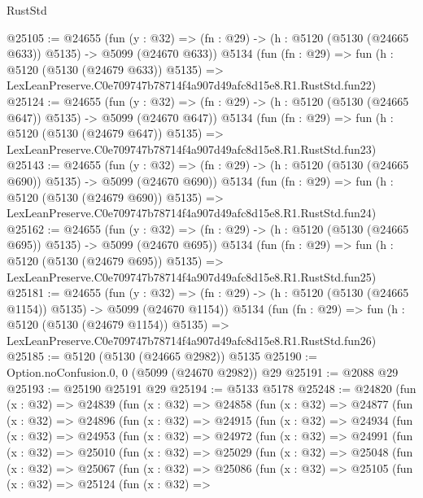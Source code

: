 \begin{lexlean}{RustStd}
\begin{coremodule}
@25105 := @24655
    (fun (y : @32) => (fn : @29) -> (h : @5120 (@5130 (@24665 @633)) @5135) -> @5099 (@24670 @633))
    @5134
    (fun (fn : @29) =>
    fun (h : @5120 (@5130 (@24679 @633)) @5135) =>
    LexLeanPreserve.C0e709747b78714f4a907d49afc8d15e8.R1.RustStd.fun22)
@25124 := @24655
    (fun (y : @32) => (fn : @29) -> (h : @5120 (@5130 (@24665 @647)) @5135) -> @5099 (@24670 @647))
    @5134
    (fun (fn : @29) =>
    fun (h : @5120 (@5130 (@24679 @647)) @5135) =>
    LexLeanPreserve.C0e709747b78714f4a907d49afc8d15e8.R1.RustStd.fun23)
@25143 := @24655
    (fun (y : @32) => (fn : @29) -> (h : @5120 (@5130 (@24665 @690)) @5135) -> @5099 (@24670 @690))
    @5134
    (fun (fn : @29) =>
    fun (h : @5120 (@5130 (@24679 @690)) @5135) =>
    LexLeanPreserve.C0e709747b78714f4a907d49afc8d15e8.R1.RustStd.fun24)
@25162 := @24655
    (fun (y : @32) => (fn : @29) -> (h : @5120 (@5130 (@24665 @695)) @5135) -> @5099 (@24670 @695))
    @5134
    (fun (fn : @29) =>
    fun (h : @5120 (@5130 (@24679 @695)) @5135) =>
    LexLeanPreserve.C0e709747b78714f4a907d49afc8d15e8.R1.RustStd.fun25)
@25181 := @24655
    (fun (y : @32) =>
    (fn : @29) -> (h : @5120 (@5130 (@24665 @1154)) @5135) -> @5099 (@24670 @1154))
    @5134
    (fun (fn : @29) =>
    fun (h : @5120 (@5130 (@24679 @1154)) @5135) =>
    LexLeanPreserve.C0e709747b78714f4a907d49afc8d15e8.R1.RustStd.fun26)
@25185 := @5120 (@5130 (@24665 @2982)) @5135
@25190 := Option.noConfusion.{0, 0} (@5099 (@24670 @2982)) @29
@25191 := @2088 @29
@25193 := @25190 @25191 @29
@25194 := @5133 @5178
@25248 := @24820
    (fun (x : @32) =>
    @24839
      (fun (x : @32) =>
      @24858
        (fun (x : @32) =>
        @24877
          (fun (x : @32) =>
          @24896
            (fun (x : @32) =>
            @24915
              (fun (x : @32) =>
              @24934
                (fun (x : @32) =>
                @24953
                  (fun (x : @32) =>
                  @24972
                    (fun (x : @32) =>
                    @24991
                      (fun (x : @32) =>
                      @25010
                        (fun (x : @32) =>
                        @25029
                          (fun (x : @32) =>
                          @25048
                            (fun (x : @32) =>
                            @25067
                              (fun (x : @32) =>
                              @25086
                                (fun (x : @32) =>
                                @25105
                                  (fun (x : @32) =>
                                  @25124
                                    (fun (x : @32) =>

\end{coremodule}
\end{lexlean}
